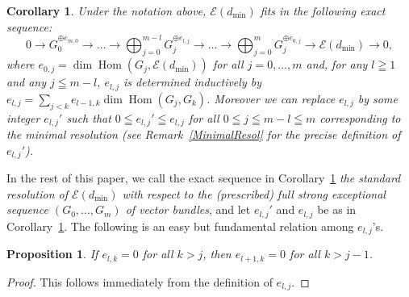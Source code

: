 \documentclass[a4paper,12pt]{amsart}
\newtheorem{prop}[thm]{Proposition}%
\newtheorem{cor}[thm]{Corollary}%
\DeclareMathOperator{\Hom}{Hom}
\begin{document}
\begin{cor}\label{Resol}
Under the notation above, $\mathcal{E}(d_{\min})$ fits in the following exact sequence:
\[0\to G_0^{\oplus e_{m,0}}\to\dots\to \bigoplus_{j=0}^{m-l}G_{j}^{\oplus e_{l,j}}\to\dots\to
\bigoplus_{j=0}^{m}G_{j}^{\oplus e_{0,j}}\to \mathcal{E}(d_{\min})\to 0,\]
where $e_{0,j}=\dim \Hom(G_j,\mathcal{E}(d_{\min}))$ for all $j=0,\dots,m$ and,
for any $l\geqq 1$ and any $j\leqq m-l$, $e_{l,j}$ is determined inductively by 
$e_{l,j}=\sum_{j<k}e_{l-1,k}\dim \Hom(G_j,G_k)$.
Moreover we can replace $e_{l,j}$ by some integer $e_{l,j}'$
such that $0\leqq e_{l,j}'\leqq e_{l,j}$ for all $0\leqq j\leqq m-l\leqq m$ 
corresponding to the minimal resolution (see Remark~\ref{MinimalResol}
for the precise definition of $e_{l,j}'$).
\end{cor}
In the rest of this paper, 
we call the exact sequence in Corollary~\ref{Resol}
\textit{the standard resolution of $\mathcal{E}(d_{\min})$
with respect to the (prescribed) full strong exceptional sequence $(G_0,\dots,G_m)$
of vector bundles},
and let $e_{l,j}'$ and $e_{l,j}$ be as in Corollary~\ref{Resol}.
The following is an easy but fundamental relation among $e_{l,j}$'s.
\begin{prop}\label{easyConst} 
If $e_{l,k}=0$ for all $k>j$, then $e_{l+1,k}=0$ for all $k>j-1$.
\end{prop}
\begin{proof}
This follows immediately from the definition of $e_{l,j}$.
\end{proof}
\end{document}
